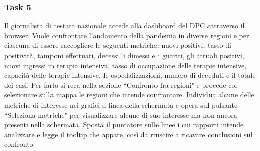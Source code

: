 
\subsubsection{Task 5}
\label{sss:cw-task-5}

Il giornalista di testata nazionale accede alla dashboard del DPC attraverso il browser.
Vuole confrontare l'andamento della pandemia in diverse regioni e per ciascuna di essere raccogliere le seguenti metriche: nuovi positivi, tasso di positività, tamponi effettuati, decessi, i dimessi e i guariti, gli attuali positivi, nuovi ingressi in terapia intensiva, tasso di occupazione delle terapie intensive, capacità delle terapie intensive, le ospedalizzazioni, numero di deceduti e il totale dei casi.
Per farlo si reca nella sezione ``Confronto fra regioni" e procede col selezionare sulla mappa le regioni che intende confrontare.
Individua alcune delle metriche di interesse nei grafici a linea della schermata e opera sul pulsante ``Seleziona metriche" per visualizzare alcune di suo interesse ma non ancora presenti nella schermata.
Sposta il puntatore sulle linee i cui rapporti intende analizzare e legge il tooltip che appare, così da riuscire a ricavare conclusioni sul confronto.